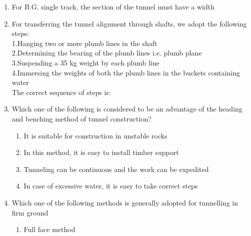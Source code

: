 \documentclass[11pt,a4paper]{article}
\begin{document}
\begin{enumerate}
\begin{enumerate*}[itemjoin=\qquad, label=\Alph*.]
\end{enumerate*}
\item{For B.G. single track, the section of the tunnel must have a width}
\\
\item{For transferring the tunnel alignment through shafts, we adopt the following steps:  \\
1.Hanging two or more plumb lines in the shaft \\
2.Determining the bearing of the plumb lines i.e. plumb plane \\
3.Suspending a 35 kg weight by each plumb line \\
4.Immersing the weights of both the plumb lines in the buckets containing water \\
The correct sequence of steps is:
}
\\
\item{Which one of the following is considered to be an advantage of the heading and benching method of tunnel construction?}
\begin{enumerate}[label=\Alph*.]
\item{It is suitable for construction in unstable rocks}
\item{In this method, it is easy to install timber support}
\item{Tunneling can be continuous and the work can be expedited}
\item{In case of excessive water, it is easy to take correct steps}
\end{enumerate}
\item{Which one of the following methods is generally adopted for tunnelling in firm ground}
\begin{enumerate}[label=\Alph*.]
\item{Full face method}

\end{enumerate}
\end{enumerate}
\end{document}

